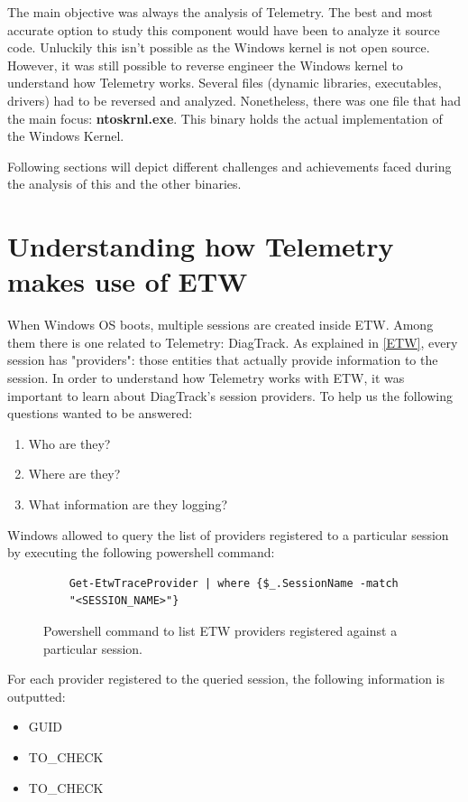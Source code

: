 The main objective was always the analysis of Telemetry. The best and most accurate option to study this component would have been to analyze it source code. Unluckily this isn't possible as the Windows kernel is not open source. However, it was still possible to reverse engineer the Windows kernel to understand how Telemetry works. 
Several files (dynamic libraries, executables, drivers) had to be reversed and analyzed. Nonetheless, there was one file that had the main focus: {\bfseries ntoskrnl.exe}. This binary holds the actual implementation of the Windows Kernel.

Following sections will depict different challenges and achievements faced during the analysis of this and the other binaries.




\section{Understanding how Telemetry makes use of ETW}\label{understanding_telemetry_etw}

When Windows OS boots, multiple sessions are created inside ETW. Among them there is one related to Telemetry: DiagTrack. As explained in \ref{ETW}, every session has "providers": those entities that actually provide information to the session. In order to understand how Telemetry works with ETW, it was important to learn about DiagTrack's session providers. To help us the following questions wanted to be answered:
\begin{enumerate}
\setlength\itemsep{0.05em}
\item Who are they?
\item Where are they?
\item What information are they logging?
\end{enumerate}

Windows allowed to query the list of providers registered to a particular session by executing the following powershell command: 

\begin{figure}[H]
  \begin{lstlisting}
    Get-EtwTraceProvider | where {$_.SessionName -match 
    "<SESSION_NAME>"}
  \end{lstlisting} 
  \caption[]{Powershell command to list ETW providers registered against a particular session. }
  \label{fig:powershell_cmd}
\end{figure}
For each provider registered to the queried session, the following information is outputted:
\begin{itemize}
  \setlength\itemsep{0.05em}
  \item GUID
  \item TO\_CHECK
  \item TO\_CHECK
\end{itemize}

